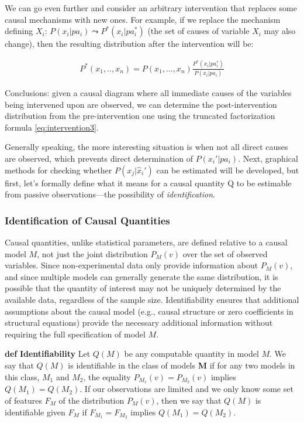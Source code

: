 \documentclass[fleqn]{article}
\def\define#1{\textbf{def} \textbf{#1}}
\numberwithin{equation}{section}
\numberwithin{theorem}{section}
\numberwithin{figure}{section}
\numberwithin{lemma}{section}
\numberwithin{corollary}{section}
\begin{document}
We can go even further and consider an arbitrary intervention that replaces some causal mechanisms with new ones. For example, if we replace the mechanism defining $X_i$: $P(x_i|pa_i) \leadsto P^*(x_i | pa^*_i)$ (the set of causes of variable $X_i$ may also change), then the resulting distribution after the intervention will be:

\begin{align}
	P^*(x_1,..,x_n) = P(x_1,...,x_n) \frac{P^*(x_i|pa^*_i)}{P(x_i|pa_i)}
\end{align}

Conclusions: given a causal diagram where all immediate causes of the variables being intervened upon are observed, we can determine the post-intervention distribution from the pre-intervention one using the truncated factorization formula \ref{eq:intervention3}.

Generally speaking, the more interesting situation is when not all direct causes are observed, which prevents direct determination of $P(x_i' | pa_i)$. Next, graphical methods for checking whether $P(x_j|\hat x_i')$ can be estimated will be developed, but first, let's formally define what it means for a causal quantity Q to be estimable from passive observations—the possibility of \textit{identification}.

\subsubsection*{Identification of Causal Quantities}

Causal quantities, unlike statistical parameters, are defined relative to a causal model $M$, not just the joint distribution $P_M(v)$ over the set of observed variables. Since non-experimental data only provide information about $P_M(v)$, and since multiple models can generally generate the same distribution, it is possible that the quantity of interest may not be uniquely determined by the available data, regardless of the sample size. Identifiability ensures that additional assumptions about the causal model (e.g., causal structure or zero coefficients in structural equations) provide the necessary additional information without requiring the full specification of model $M$.

\define{Identifiability} Let $Q(M)$ be any computable quantity in model $M$. We say that $Q(M)$ is identifiable in the class of models \textbf{M} if for any two models in this class, $M_1$ and $M_2$, the equality $P_{M_1}(v) = P_{M_2}(v)$ implies $Q(M_1) = Q(M_2)$. If our observations are limited and we only know some set of features $F_M$ of the distribution $P_M(v)$, then we say that $Q(M)$ is identifiable given $F_M$ if $F_{M_1} = F_{M_2}$ implies $Q(M_1) = Q(M_2)$.
\end{document}
